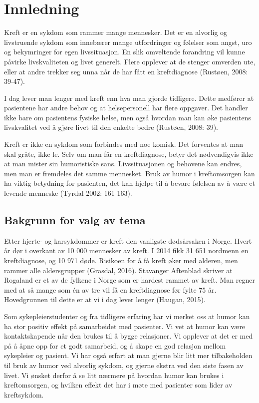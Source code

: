 \chapter{Innledning}

Kreft er en sykdom som rammer mange mennesker. Det er en alvorlig og
livstruende sykdom som innebærer mange utfordringer og følelser som angst, uro
og bekymringer for egen livssituasjon. En slik omveltende forandring vil kunne
påvirke livskvaliteten og livet generelt. Flere opplever at de stenger omverden
ute, eller at andre trekker seg unna når de har fått en kreftdiagnose (Rustøen,
2008: 39-47).

I dag lever man lenger med kreft enn hva man gjorde tidligere. Dette medfører
at pasientene har andre behov og at helsepersonell har flere oppgaver. Det
handler ikke bare om pasientens fysiske helse, men også hvordan man kan øke
pasientens livskvalitet ved å gjøre livet til den enkelte bedre (Rustøen, 2008:
39).

Kreft er ikke en sykdom som forbindes med noe komisk. Det forventes at man skal
gråte, ikke le. Selv om man får en kreftdiagnose, betyr det nødvendigvis ikke
at man mister sin humoristiske sans. Livssituasjonen og behovene kan endres,
men man er fremdeles det samme mennesket. Bruk av humor i kreftomsorgen kan ha
viktig betydning for pasienten, det kan hjelpe til å bevare følelsen av å være
et levende menneske (Tyrdal 2002: 161-163).

\section{Bakgrunn for valg av tema}

Etter hjerte- og karsykdommer er kreft den vanligste dødsårsaken i Norge. Hvert
år dør i overkant av 10 000 mennesker av kreft. I 2014 fikk 31 651 nordmenn en
kreftdiagnose, og 10 971 døde. Risikoen for å få kreft øker med alderen, men
rammer alle aldersgrupper (Grasdal, 2016). Stavanger Aftenblad skriver at
Rogaland er et av de fylkene i Norge som er hardest rammet av kreft. Man regner
med at så mange som én av tre vil få en kreftdiagnose før fylte 75 år.
Hovedgrunnen til dette er at vi i dag lever lenger (Haugan, 2015).

Som sykepleierstudenter og fra tidligere erfaring har vi merket oss at humor
kan ha stor positiv effekt på samarbeidet med pasienter. Vi vet at humor kan
være kontaktskapende når den brukes til å bygge relasjoner. Vi opplever at det
er med på å åpne opp for et godt samarbeid, og å skape en god relasjon mellom
sykepleier og pasient. Vi har også erfart at man gjerne blir litt mer
tilbakeholden til bruk av humor ved alvorlig sykdom, og gjerne ekstra ved den
siste fasen av livet. Vi ønsket derfor å se litt nærmere på hvordan humor kan
brukes i kreftomsorgen, og hvilken effekt det har i møte med pasienter som
lider av kreftsykdom.

